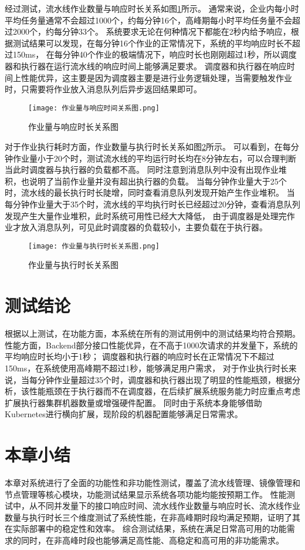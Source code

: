 经过测试，流水线作业数量与响应时长关系如图\ref{fig:作业量与响应时长关系图}所示。
通常来说，企业内每小时平均任务量通常不会超过1000个，约每分钟16个，高峰期每小时平均任务量不会超过2000个，约每分钟33个。
系统要求无论在何种情况下都能在2秒内给予响应，根据测试结果可以发现，在每分钟16个作业的正常情况下，系统的平均响应时长不超过150ms，
在每分钟40个作业的极端情况下，响应时长也刚刚超过1秒，所以调度器和执行器在运行流水线的响应时间上能够满足要求。
调度器和执行器在响应时间上性能优异，这主要是因为调度器主要是进行业务逻辑处理，当需要触发作业时，只需要将作业放入消息队列后异步返回结果即可。

\begin{figure}[h]
  \centering
  \texttt{[image: 作业量与响应时间关系图.png]}
  \caption{作业量与响应时长关系图}
  \label{fig:作业量与响应时长关系图}
\end{figure}

对于作业执行耗时方面，作业数量与执行时长关系如图\ref{fig:作业量与执行时长关系图}所示。
可以看到，在每分钟作业量小于20个时，测试流水线的平均运行时长均在8分钟左右，可以合理判断当此时调度器与执行器的负载都不高。
同时注意到消息队列中没有出现作业堆积，也说明了当前作业量并没有超出执行器的负载。
当每分钟作业量大于25个时，流水线的最长执行时长陡增，同时查看消息队列发现开始产生作业堆积。
当每分钟作业量大于35个时，流水线的平均执行时长已经超过20分钟，查看消息队列发现产生大量作业堆积，此时系统可用性已经大大降低，
由于调度器是处理完作业才放入消息队列，可见此时调度器的负载较小，主要负载在于执行器。

\begin{figure}[h]
  \centering
  \texttt{[image: 作业量与执行时长关系图.png]}
  \caption{作业量与执行时长关系图}
  \label{fig:作业量与执行时长关系图}
\end{figure}

\section{测试结论}

根据以上测试，在功能方面，本系统在所有的测试用例中的测试结果均符合预期。性能方面，Backend部分接口性能优异，在不高于1000次请求的并发量下，系统的平均响应时长均小于1秒；
调度器和执行器的响应时长在正常情况下不超过150ms，在系统使用高峰期不超过1秒，能够满足用户需求，
对于作业执行时长来说，当每分钟作业量超过35个时，调度器和执行器出现了明显的性能瓶颈，根据分析，该性能瓶颈在于执行器而不在调度器，在后续扩展系统服务能力时应重点考虑扩展执行器集群机器数量或增强硬件配置。
同时由于系统本身能够借助Kubernetes进行横向扩展，现阶段的机器配置能够满足日常需求。


\section{本章小结}
本章对系统进行了全面的功能性和非功能性测试，覆盖了流水线管理、镜像管理和节点管理等核心模块，功能测试结果显示系统各项功能均能按预期工作。
性能测试中，从不同并发量下的接口响应时间、流水线作业数量与响应时长、流水线作业数量与执行时长三个维度测试了系统性能，在非高峰期时段均满足预期，证明了其在实际部署中的稳定性和效率。
综合测试结果，系统在满足日常高可用的功能需求的同时，在非高峰时段也能够满足高性能、高稳定和高可用的非功能需求。